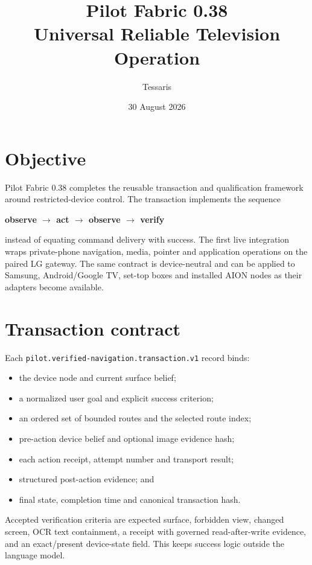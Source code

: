 \documentclass[11pt,a4paper]{article}
\title{Pilot Fabric 0.38\\Universal Reliable Television Operation}
\author{Tessaris}
\date{30 August 2026}
\begin{document}
\maketitle

\section{Objective}

Pilot Fabric 0.38 completes the reusable transaction and qualification framework around restricted-device
control.  The transaction implements the sequence

\begin{center}
\textbf{observe $\rightarrow$ act $\rightarrow$ observe $\rightarrow$ verify}
\end{center}

instead of equating command delivery with success.  The first live integration
wraps private-phone navigation, media, pointer and application operations on the
paired LG gateway.  The same contract is device-neutral and can be applied to
Samsung, Android/Google TV, set-top boxes and installed AION nodes as their
adapters become available.

\section{Transaction contract}

Each \nolinkurl{pilot.verified-navigation.transaction.v1} record binds:

\begin{itemize}
  \item the device node and current surface belief;
  \item a normalized user goal and explicit success criterion;
  \item an ordered set of bounded routes and the selected route index;
  \item pre-action device belief and optional image evidence hash;
  \item each action receipt, attempt number and transport result;
  \item structured post-action evidence; and
  \item final state, completion time and canonical transaction hash.
\end{itemize}

Accepted verification criteria are expected surface, forbidden view, changed
screen, OCR text containment, a receipt with governed read-after-write evidence,
and an exact/present device-state field.  This
keeps success logic outside the language model.
\end{document}

